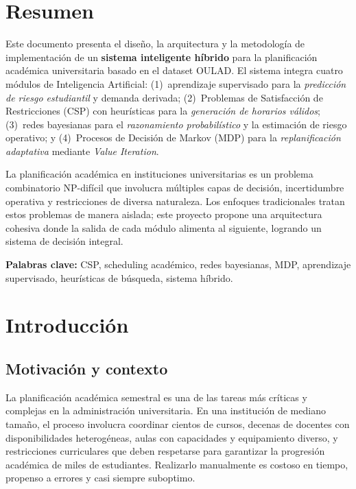 \documentclass[12pt,twoside]{report}
\theoremstyle{definition}
\begin{document}
\tableofcontents\clearpage

\chapter*{Resumen}

\begin{importante}
Este documento presenta el dise\~no, la arquitectura y la metodolog\'ia de
implementaci\'on de un \textbf{sistema inteligente h\'ibrido} para la
planificaci\'on acad\'emica universitaria basado en el dataset OULAD. El sistema integra cuatro m\'odulos
de Inteligencia Artificial: (1)~aprendizaje supervisado para la \emph{predicci\'on
de riesgo estudiantil} y demanda derivada; (2)~Problemas de Satisfacci\'on de Restricciones (CSP) con
heur\'isticas para la \emph{generaci\'on de horarios v\'alidos}; (3)~redes
bayesianas para el \emph{razonamiento probabil\'istico} y la estimaci\'on de riesgo operativo;
y (4)~Procesos de Decisi\'on de Markov (MDP) para la \emph{replanificaci\'on
adaptativa} mediante \emph{Value Iteration}.
\end{importante}

La planificaci\'on acad\'emica en instituciones universitarias es un problema
combinatorio NP-dif\'icil que involucra m\'ultiples capas de decisi\'on, incertidumbre
operativa y restricciones de diversa naturaleza.  Los enfoques tradicionales tratan
estos problemas de manera aislada; este proyecto propone una arquitectura cohesiva
donde la salida de cada m\'odulo alimenta al siguiente, logrando un sistema de
decisi\'on integral.

\textbf{Palabras clave:} CSP, scheduling acad\'emico, redes bayesianas, MDP,
aprendizaje supervisado, heur\'isticas de b\'usqueda, sistema h\'ibrido.

\chapter{Introducci\'on}

\section{Motivaci\'on y contexto}

La planificaci\'on acad\'emica semestral es una de las tareas m\'as cr\'iticas y
complejas en la administraci\'on universitaria.  En una instituci\'on de mediano
tama\~no, el proceso involucra coordinar cientos de cursos, decenas de docentes
con disponibilidades heterog\'eneas, aulas con capacidades y equipamiento diverso,
y restricciones curriculares que deben respetarse para garantizar la progresi\'on
acad\'emica de miles de estudiantes.  Realizarlo manualmente es costoso en tiempo,
propenso a errores y casi siempre suboptimo.
\end{document}
